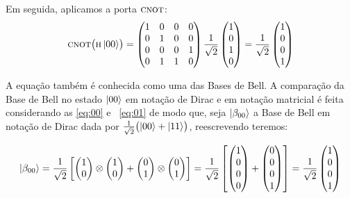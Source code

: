 Em seguida, aplicamos a porta \(\operatorname{\textsc{cnot}}\):
\begin{equation}
  \operatorname{\textsc{cnot}} \bigl( \operatorname{\textsc{h}} \ket{00} \bigr) =
\begin{pmatrix}
1 & 0 & 0 & 0 \\
0 & 1 & 0 & 0 \\
0 & 0 & 0 & 1 \\
0 & 1 & 1 & 0
\end{pmatrix}
\frac{1}{\sqrt{2}}\begin{pmatrix}
1 \\
0 \\
1 \\
0
\end{pmatrix} = \frac{1}{\sqrt{2}} \begin{pmatrix}
1 \\
0 \\
0 \\
1
\end{pmatrix}
\end{equation}

A equação também é conhecida como uma das Bases de Bell. A comparação da Base de Bell no estado $\ket{00}$ em notação de Dirac e em notação matricial é feita considerando as \eqref{eq:00} e ~\eqref{eq:01} de modo que, seja \(\ket{\beta_{00}}\) a Base de Bell em notação de Dirac dada por \(\frac{1}{\sqrt{2}} \bigl(\ket{00} + \ket{11}\bigr)\), reescrevendo teremos:

\begin{equation}\label{eq:comparacaobeta}
\ket{\beta_{00}} = \frac{1}{\sqrt{2}} \left[ \begin{pmatrix}
1 \\
0
\end{pmatrix} \otimes \begin{pmatrix}
1 \\
0
\end{pmatrix} + \begin{pmatrix}
0 \\
1
\end{pmatrix} \otimes \begin{pmatrix}
0 \\
1
\end{pmatrix}\right] = \frac{1}{\sqrt{2}} \left[ \begin{pmatrix}
1 \\
0 \\
0 \\
0 
\end{pmatrix} + \begin{pmatrix}
0 \\
0 \\
0 \\
1 
\end{pmatrix}\right] = \frac{1}{\sqrt{2}} \begin{pmatrix}
1 \\
0 \\
0 \\
1 
\end{pmatrix}
\end{equation}

